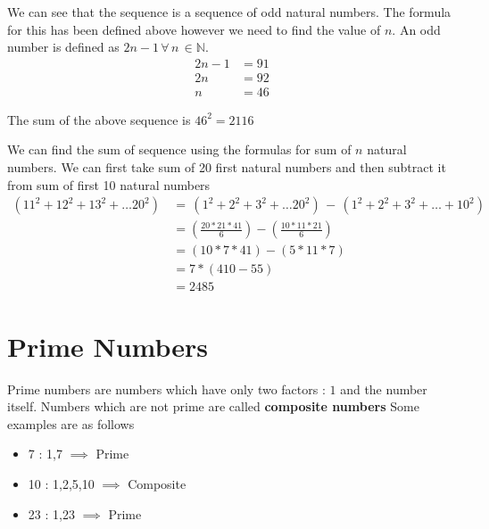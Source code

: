 
We can see that the sequence is a sequence of odd natural numbers. The formula for this has been defined above however we need to find the value of $n$. An odd number is defined as $2n - 1 \, \forall \, n \, \in \mathbb{N} $. 
\begin{align*}
    2n - 1 &= 91 \\
    2n &= 92 \\
    n &= 46
\end{align*}

The sum of the above sequence is $46^2 = 2116$


We can find the sum of sequence using the formulas for sum of $n$ natural numbers. We can first take sum of 20 first natural numbers and then subtract it from sum of first 10 natural numbers
\begin{align*}
    (11^2 + 12^2 + 13^2 + \dots 20^2) \, &= \, (1^2 + 2^2 + 3^2 + \dots 20^2) \, - \, (1^2 + 2^2 + 3^2 + \dots + 10^2) \\
    &= \left ( \displaystyle{ \frac{20 * 21 * 41}{6} }  \right ) - \left ( \displaystyle{ \frac{10 * 11 * 21}{6} }  \right ) \\
    &= (10 * 7 * 41) - (5 * 11 * 7) \\
    &= 7 * (410 - 55) \\
    &= 2485
\end{align*}

\section{Prime Numbers}
Prime numbers are numbers which have only two factors : $1$ and the number itself. Numbers which are not prime are called \textbf{composite numbers} Some examples are as follows

\begin{itemize}
    \item 7 : 1,7 $\implies$ Prime
    \item 10 : 1,2,5,10 $\implies$ Composite 
    \item 23 : 1,23 $\implies$ Prime
\end{itemize}

